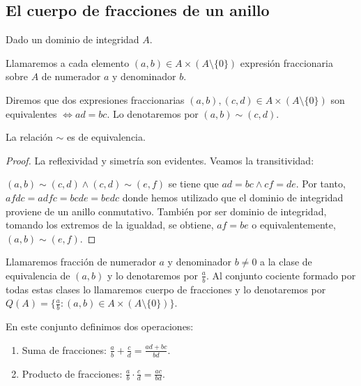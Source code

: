 \subsection{El cuerpo de fracciones de un anillo}

\begin{definition}
Dado un dominio de integridad $A$. 

Llamaremos a cada elemento $(a,b) \in A \times (A \setminus \{0\})$ expresión fraccionaria sobre $A$ de numerador $a$ y denominador $b$. 

Diremos que dos expresiones fraccionarias $(a,b),(c,d) \in A \times (A \setminus \{0\})$ son equivalentes $\iff ad = bc$. Lo denotaremos por $(a,b) \sim (c,d)$. 
\end{definition}

\begin{proposition}
La relación $\sim$ es de equivalencia. 
\end{proposition}
\begin{proof}
La reflexividad y simetría son evidentes. Veamos la transitividad:

$(a,b) \sim (c,d) \land (c,d) \sim (e,f)$ se tiene que $ad = bc \land cf = de$. Por tanto, $afdc = adfc = bcde = bedc$ donde hemos utilizado que el dominio de integridad proviene de un anillo conmutativo. También por ser dominio de integridad, tomando los extremos de la igualdad, se obtiene, $af = be$ o equivalentemente, $(a,b) \sim (e,f)$.  
\end{proof}

\begin{definition}
Llamaremos fracción de numerador $a$ y denominador $b \neq 0$ a la clase de equivalencia de $(a,b)$ y lo denotaremos por $\frac{a}{b}$. Al conjunto cociente formado por todas estas clases lo llamaremos cuerpo de fracciones y lo denotaremos por $Q(A) = \{\frac{a}{b}:(a,b) \in A \times (A \setminus \{0\})\}$. 

En este conjunto definimos dos operaciones:

\begin{enumerate}
\item Suma de fracciones: $\frac{a}{b} + \frac{c}{d} = \frac{ad+bc}{bd}$.
\item Producto de fracciones: $\frac{a}{b} \cdot \frac{c}{d} = \frac{ac}{bd}$.
\end{enumerate}
\end{definition}

